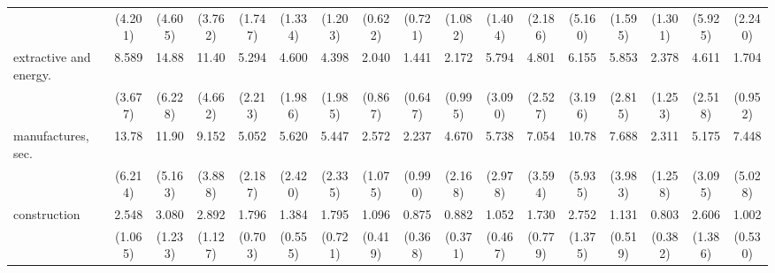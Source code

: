 {\begin{tabular}{l*{16}{c}}
                    &     (4.201)         &     (4.605)         &     (3.762)         &     (1.747)         &     (1.334)         &     (1.203)         &     (0.622)         &     (0.721)         &     (1.082)         &     (1.404)         &     (2.186)         &     (5.160)         &     (1.595)         &     (1.301)         &     (5.925)         &     (2.240)         \\
[1em]
extractive and energy.&       8.589\sym{***}&       14.88\sym{***}&       11.40\sym{***}&       5.294\sym{***}&       4.600\sym{***}&       4.398\sym{**} &       2.040         &       1.441         &       2.172         &       5.794\sym{***}&       4.801\sym{**} &       6.155\sym{***}&       5.853\sym{***}&       2.378         &       4.611\sym{**} &       1.704         \\
                    &     (3.677)         &     (6.228)         &     (4.662)         &     (2.213)         &     (1.986)         &     (1.985)         &     (0.867)         &     (0.647)         &     (0.995)         &     (3.090)         &     (2.527)         &     (3.196)         &     (2.815)         &     (1.253)         &     (2.518)         &     (0.952)         \\
[1em]
manufactures, sec.  &       13.78\sym{***}&       11.90\sym{***}&       9.152\sym{***}&       5.052\sym{***}&       5.620\sym{***}&       5.447\sym{***}&       2.572\sym{*}  &       2.237         &       4.670\sym{***}&       5.738\sym{***}&       7.054\sym{***}&       10.78\sym{***}&       7.688\sym{***}&       2.311         &       5.175\sym{**} &       7.448\sym{**} \\
                    &     (6.214)         &     (5.163)         &     (3.888)         &     (2.187)         &     (2.420)         &     (2.335)         &     (1.075)         &     (0.990)         &     (2.168)         &     (2.978)         &     (3.594)         &     (5.935)         &     (3.983)         &     (1.258)         &     (3.095)         &     (5.028)         \\
[1em]
construction        &       2.548\sym{*}  &       3.080\sym{**} &       2.892\sym{**} &       1.796         &       1.384         &       1.795         &       1.096         &       0.875         &       0.882         &       1.052         &       1.730         &       2.752\sym{*}  &       1.131         &       0.803         &       2.606         &       1.002         \\
                    &     (1.065)         &     (1.233)         &     (1.127)         &     (0.703)         &     (0.555)         &     (0.721)         &     (0.419)         &     (0.368)         &     (0.371)         &     (0.467)         &     (0.779)         &     (1.375)         &     (0.519)         &     (0.382)         &     (1.386)         &     (0.530)         \\

\end{tabular}}
